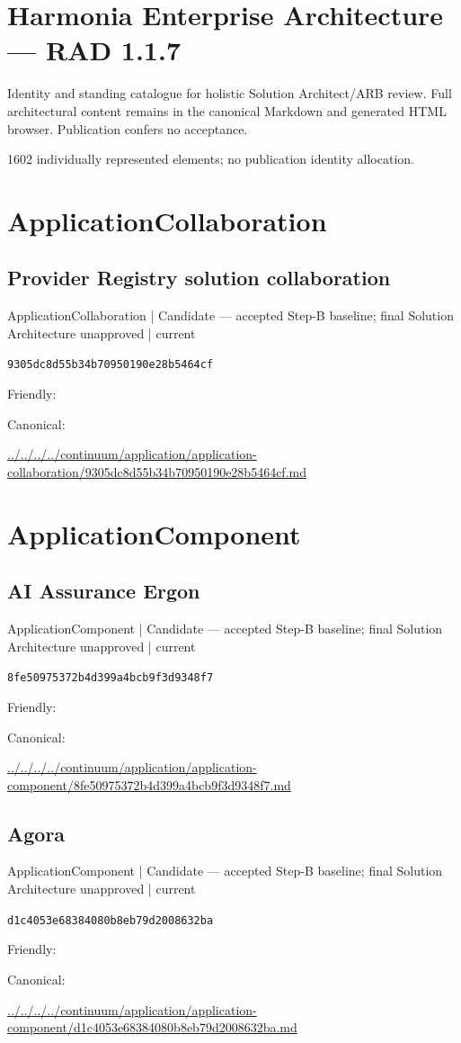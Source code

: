 \documentclass[10pt,a4paper]{article}
\begin{document}
\section*{Harmonia Enterprise Architecture — RAD 1.1.7}
Identity and standing catalogue for holistic Solution Architect/ARB review. Full architectural content remains in the canonical Markdown and generated HTML browser. Publication confers no acceptance.\par
1602 individually represented elements; no publication identity allocation.\par
\section*{ApplicationCollaboration}
\subsection*{Provider Registry solution collaboration}
{\small ApplicationCollaboration | Candidate — accepted Step-B baseline; final Solution Architecture unapproved | current}\par
\texttt{9305dc8d55b34b70950190e28b5464cf}\par
Friendly: \par
Canonical: \par
{\footnotesize\url{../../../../continuum/application/application-collaboration/9305dc8d55b34b70950190e28b5464cf.md}}\par
\section*{ApplicationComponent}
\subsection*{AI Assurance Ergon}
{\small ApplicationComponent | Candidate — accepted Step-B baseline; final Solution Architecture unapproved | current}\par
\texttt{8fe50975372b4d399a4bcb9f3d9348f7}\par
Friendly: \par
Canonical: \par
{\footnotesize\url{../../../../continuum/application/application-component/8fe50975372b4d399a4bcb9f3d9348f7.md}}\par
\subsection*{Agora}
{\small ApplicationComponent | Candidate — accepted Step-B baseline; final Solution Architecture unapproved | current}\par
\texttt{d1c4053e68384080b8eb79d2008632ba}\par
Friendly: \par
Canonical: \par
{\footnotesize\url{../../../../continuum/application/application-component/d1c4053e68384080b8eb79d2008632ba.md}}\par
\end{document}
